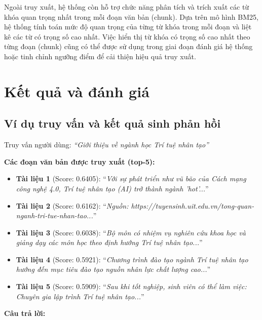 Ngoài truy xuất, hệ thống còn hỗ trợ chức năng phân tích và trích xuất các từ khóa quan trọng nhất trong mỗi đoạn văn bản (chunk). Dựa trên mô hình BM25, hệ thống tính toán mức độ quan trọng của từng từ khóa trong mỗi đoạn và liệt kê các từ có trọng số cao nhất. Việc hiển thị từ khóa có trọng số cao nhất theo từng đoạn (chunk) cũng có thể được sử dụng trong giai đoạn đánh giá hệ thống hoặc tinh chỉnh ngưỡng điểm để cải thiện hiệu quả truy xuất.

\section{Kết quả và đánh giá}

\subsection{Ví dụ truy vấn và kết quả sinh phản hồi}

Truy vấn người dùng: \textit{``Giới thiệu về ngành học Trí tuệ nhân tạo''}

\textbf{Các đoạn văn bản được truy xuất (top-5):}
\begin{itemize}
    \item \textbf{Tài liệu 1} (Score: 0.6405): ``\textit{Với sự phát triển như vũ bão của Cách mạng công nghệ 4.0, Trí tuệ nhân tạo (AI) trở thành ngành 'hot'...}''
    \item \textbf{Tài liệu 2} (Score: 0.6162): ``\textit{Nguồn: https://\allowbreak{}tuyensinh.uit.edu.vn/\allowbreak{}tong-quan-nganh-tri-tue-nhan-tao...}''
    \item \textbf{Tài liệu 3} (Score: 0.6038): ``\textit{Bộ môn có nhiệm vụ nghiên cứu khoa học và giảng dạy các môn học theo định hướng Trí tuệ nhân tạo...}''
    \item \textbf{Tài liệu 4} (Score: 0.5921): ``\textit{Chương trình đào tạo ngành Trí tuệ nhân tạo hướng đến mục tiêu đào tạo nguồn nhân lực chất lượng cao...}''
    \item \textbf{Tài liệu 5} (Score: 0.5909): ``\textit{Sau khi tốt nghiệp, sinh viên có thể làm việc: Chuyên gia lập trình Trí tuệ nhân tạo...}''
\end{itemize}

\textbf{Câu trả lời:}

